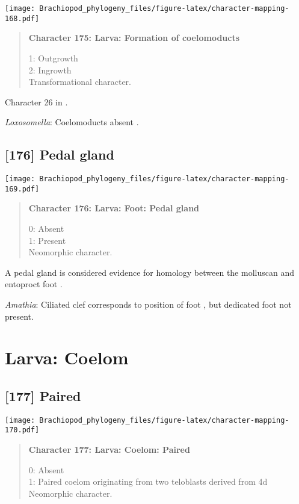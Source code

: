 \documentclass[openany]{book}
\theoremstyle{definition}
\theoremstyle{definition}
\theoremstyle{definition}
\theoremstyle{remark}
\begin{document}
\texttt{[image: Brachiopod\_phylogeny\_files/figure-latex/character-mapping-168.pdf]}

\begin{quote}
\textbf{Character 175: Larva: Formation of coelomoducts}

1: Outgrowth\\
2: Ingrowth\\
Transformational character.
\end{quote}

Character 26 in \citet{Haszprunar2000}.

\hypertarget{Loxosomella-coding-175}{}
\emph{Loxosomella}: Coelomoducts absent \citep{Haszprunar2000}.

\subsection*{{[}176{]} Pedal gland}\label{pedal-gland}

\texttt{[image: Brachiopod\_phylogeny\_files/figure-latex/character-mapping-169.pdf]}

\begin{quote}
\textbf{Character 176: Larva: Foot: Pedal gland}

0: Absent\\
1: Present\\
Neomorphic character.
\end{quote}

A pedal gland is considered evidence for homology between the molluscan
and entoproct foot \citep{Haszprunar2008}.

\hypertarget{Amathia-coding-176}{}
\emph{Amathia}: Ciliated clef corresponds to position of foot
\citep{Reed1982}, but dedicated foot not present.

\section{Larva: Coelom}\label{larva-coelom}

\subsection*{{[}177{]} Paired}\label{paired}

\texttt{[image: Brachiopod\_phylogeny\_files/figure-latex/character-mapping-170.pdf]}

\begin{quote}
\textbf{Character 177: Larva: Coelom: Paired}

0: Absent\\
1: Paired coelom originating from two teloblasts derived from 4d\\
Neomorphic character.
\end{quote}
\end{document}

